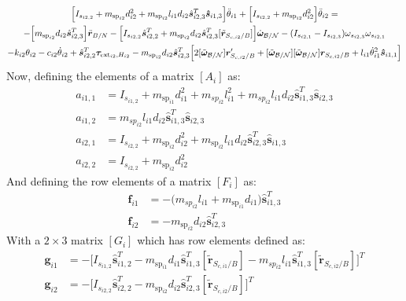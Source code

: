 \documentclass[paper]{aiaaNew}
\begin{document}
\begin{multline}
 \Big[I_{s_{i2,2}} + m_{\text{sp}_{i2}} d_{i2}^2 + m_{\text{sp}_{i2}} l_{i1} d_{i2} \hat{\bm s}_{i2,3}^T \bm{\hat{s}}_{i1,3} \Big] \ddot\theta_{i1} 
+ \Big[I_{s_{i2,2}} + m_{\text{sp}_{i2}} d_{i2}^2 \Big] \ddot\theta_{i2} 
= \\
-\Big[m_{\text{sp}_{i2}} d_{i2} \hat{\bm s}_{i2,3}^T\Big] \ddot{\bm{r}}_{B/N} - \Big[I_{s_{i2,2}} \hat{\bm s}_{i2,2}^T + m_{\text{sp}_{i2}} d_{i2} \hat{\bm s}_{i2,3}^T [\tilde{\bm{r}}_{S_{c,i2}/B}]\Big] \dot{\bm\omega}_{\cal B/N} - (I_{s_{i2,1}} - I_{s_{i2,3}}) \omega_{s_{i2,3}} \omega_{s_{i2,1}} \\
- k_{i2} \theta_{i2} - c_{i2} \dot{\theta}_{i2} + \hat{\bm s}_{i2,2}^T \bm \tau_{\text{ext}_{i2},H_{i2}}  
-  m_{\text{sp}_{i2}} d_{i2} \hat{\bm s}_{i2,3}^T \Big[ 2 [\tilde{\bm\omega}_{\cal B/N}] \bm{r}'_{S_{c,i2}/B} + [\tilde{\bm\omega}_{\cal B/N}] [\tilde{\bm\omega}_{\cal B/N}] \bm{r}_{S_{c,i2}/B} + l_{i1} \dot{\theta}_{i1}^2 \bm{\hat{s}}_{i1,1} \Big]
\label{eq:sp3final}
\end{multline}
Now, defining the elements of a matrix $[A_i]$ as:
\begin{subequations}
	\begin{align}
	a_{i1,1} &= I_{s_{i1,2}} + m_{\text{sp}_{i1}} d^2_{i1} + m_{sp_{i2}} l^2_{i1}+ m_{sp_{i2}} l_{i1} d_{i2}\hat{\bm s}^T_{i1,3}  \bm{\hat{s}}_{i2,3} \\
	a_{i1,2} &= m_{sp_{i2}} l_{i1} d_{i2} \hat{\bm s}^T_{i1,3}  \bm{\hat{s}}_{i2,3}\\
	a_{i2,1} &= I_{s_{i2,2}} + m_{\text{sp}_{i2}} d^2_{i2}  +  m_{\text{sp}_{i2}} l_{i1} d_{i2}\hat{\bm s}^T_{i2,3}  \bm{\hat{s}}_{i1,3} \\
	a_{i2,2} &= I_{s_{i2,2}} +  m_{\text{sp}_{i2}} d^2_{i2}
	\end{align}
\end{subequations}
And defining the row elements of a matrix $[F_i]$ as:
\begin{subequations}
	\begin{align}
	\bm f_{i1} &= -\big(m_{sp_{i2}} l_{i1} + m_{\text{sp}_{i1}} d_{i1} \big) \hat{\bm s}^T_{i1,3}\\
	\bm f_{i2} &= -m_{\text{sp}_{i2}} d_{i2} \hat{\bm s}_{i2,3}^T
	\end{align}
\end{subequations}
With a $2\times 3$ matrix $[G_i]$ which has row elements defined as:
\begin{subequations}
	\begin{align}
	\bm g_{i1} &= - \Big[I_{s_{i1,2}} \hat{\bm s}_{i1,2}^T - m_{\text{sp}_{i1}} d_{i1} \hat{\bm s}_{i1,3}^T [\tilde{\bm{r}}_{S_{c,i1}/B}] - m_{sp_{i2}} l_{i1} \hat{\bm s}_{i1,3}^T [\tilde{\bm{r}}_{S_{c,i2}/B}] \Big]^T\\
	\bm g_{i2} &= -  \Big[I_{s_{i2,2}} \hat{\bm s}_{i2,2}^T - m_{\text{sp}_{i2}} d_{i2} \hat{\bm s}_{i2,3}^T [\tilde{\bm{r}}_{S_{c,i2}/B}]\Big]^T
	\end{align}
\end{subequations}
\end{document}
